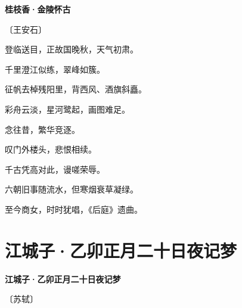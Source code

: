 \documentclass[12pt,UTF-8,openany,fontset=none]{ctexbook}
\begin{document}

\begin{center}
    {\bfseries 桂枝香·金陵怀古}

    \vspace{18pt}

    \begin{large}\xuwen
        〔王安石〕
    \end{large}

\end{center}

    \vspace{18pt}  %

\begin{center}
    \begin{Large}

        登临送目，正故国晚秋，天气初肃。

        千里澄江似练，翠峰如簇。

        征帆去棹残阳里，背西风、酒旗斜矗。

        彩舟云淡，星河鹭起，画图难足。

        \vspace{18pt}  %

        念往昔，繁华竞逐。

        叹门外楼头，悲恨相续。

        千古凭高对此，谩嗟荣辱。

        六朝旧事随流水，但寒烟衰草凝绿。

        至今商女，时时犹唱，《后庭》遗曲。

    \end{Large}

\end{center}

\vspace{8pt}
\clearpage

\section{江城子·乙卯正月二十日夜记梦}


\begin{center}
    {\bfseries 江城子·乙卯正月二十日夜记梦}

    \vspace{18pt}

    \begin{large}\xuwen
        〔苏轼〕
    \end{large}

\end{center}
\end{document}
